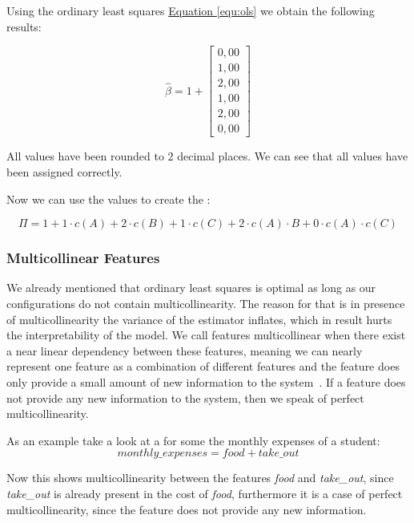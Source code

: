 Using the ordinary least squares \hyperref[equ:ols]{Equation \ref*{equ:ols}}  we obtain the following results:

\begin{equation}
    \hat{\beta} = 1 + 
    \begin{bmatrix}
        0,00 \\
        1,00 \\
        2,00 \\
        1,00 \\
        2,00 \\
        0,00
    \end{bmatrix}
\end{equation}

All values have been rounded to 2 decimal places. 
We can see that all values have been assigned correctly.

Now we can use the values to create the \perfInfluenceModel:

\begin{equation}\label{equ:performanceExamplePIMBlackBox}
    \Pi = 1 + 1 \cdot c(A) + 2 \cdot c(B) + 1 \cdot c(C) + 2 \cdot c(A) \cdot B + 0 \cdot c(A) \cdot c(C)
\end{equation}

\subsubsection{Multicollinear Features}\label{ColinearF}
We already mentioned that ordinary least squares is optimal as long as our configurations do not contain multicollinearity. The reason for that
is in presence of multicollinearity the variance of the estimator inflates, which in result hurts the interpretability of the model.
We call features multicollinear when there exist a near linear dependency between these features, meaning we can nearly represent one feature as a combination
of different features and the feature does only provide a small amount of new information to the system~\cite{Linear-Regression}. If a feature does not provide
any new information to the system, then we speak of perfect multicollinearity.

As an example take a look at a {\perfInfluenceModel} for some the monthly expenses of a student:
\begin{equation*}
    monthly\_expenses = \textit{food} + \textit{take\_out}
\end{equation*}

Now this shows multicollinearity between the features \textit{food} and \textit{take\_out}, since \textit{take\_out} is already present in the cost of \textit{food},
furthermore it is a case of perfect multicollinearity, since the feature does not provide any new information.

